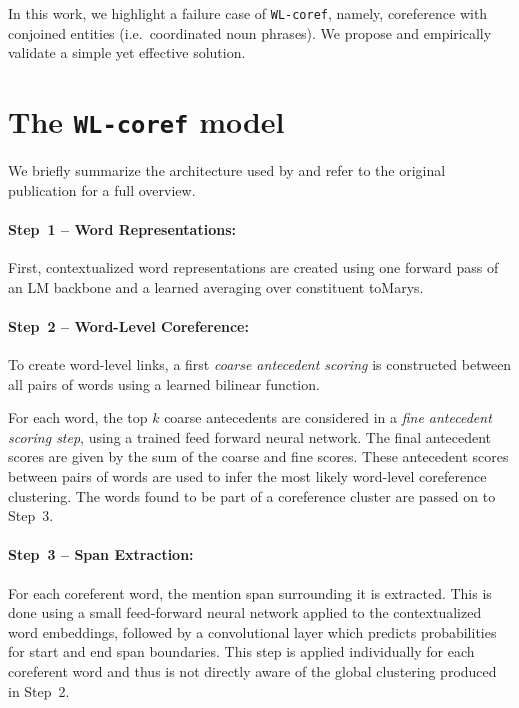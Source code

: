 \documentclass[11pt]{article}
\newcommand\wlcoref{{\texttt{WL-coref}}}
\begin{document}
In this work, we highlight a failure case of \wlcoref{}, namely, coreference with conjoined entities (i.e.~coordinated noun phrases). We propose and empirically validate a simple yet effective solution. 





















    



\section{The \wlcoref{} model}
We briefly summarize the architecture used by \citet{dobrovolskii-2021-word} and refer to the original publication for a full overview.

\paragraph{Step~1 -- Word Representations:}First, contextualized word representations are created using one forward pass of an LM backbone and a learned averaging over constituent toMarys.

\paragraph{Step~2 -- Word-Level Coreference:} To create word-level links, a first \emph{coarse antecedent scoring} is constructed between all pairs of words using a learned bilinear function.

For each word, the top $k$ coarse antecedents are considered in a \emph{fine antecedent scoring step}, using a trained feed forward neural network.
The final antecedent scores are given by the sum of the coarse and fine scores. These antecedent scores between pairs of words are used to infer the most likely word-level coreference clustering.
The words found to be part of a coreference cluster are passed on to Step~3.

\paragraph{Step~3 -- Span Extraction:} For each coreferent word, the mention span surrounding it is extracted. This is done using a small feed-forward neural network applied to the contextualized word embeddings, followed by a  convolutional layer which predicts probabilities for start and end span boundaries. This step is applied individually for each coreferent word and thus is not directly aware of the global clustering produced in Step~2. 
\end{document}
